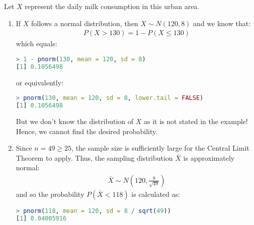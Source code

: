 \begin{solution}
    Let \( X \) represent the daily milk consumption in this urban area.
    \begin{enumerate}
        \item If \( X \) follows a normal distribution, then \( X \sim N(120, 8) \) and we know that:
        \begin{gather*}
            P(X > 130) = 1 - P(X \leq 130)
        \end{gather*}
        which equals:
        \begin{lstlisting}[language=R]
> 1 - pnorm(130, mean = 120, sd = 8)
[1] 0.1056498
        \end{lstlisting}
        or equivalently:
        \begin{lstlisting}[language=R]
> pnorm(130, mean = 120, sd = 8, lower.tail = FALSE)
[1] 0.1056498
        \end{lstlisting}
        But we don't know the distribution of \( X \) as it is not stated in the example!
        Hence, we cannot find the desired probability.
        \item Since \( n = 49 \geq 25 \), the sample size is sufficiently large for the Central Limit Theorem to apply.
        Thus, the sampling distribution \( \bar{X} \) is approximately normal:
        \begin{gather*}
            \bar{X} \sim N(120, \frac{8}{\sqrt{49}})
        \end{gather*}
        and so the probability \( P(\bar{X} < 118) \) is calculated as:
        \begin{lstlisting}[language=R]
> pnorm(118, mean = 120, sd = 8 / sqrt(49))
[1] 0.04005916
        \end{lstlisting}
    \end{enumerate}
\end{solution}